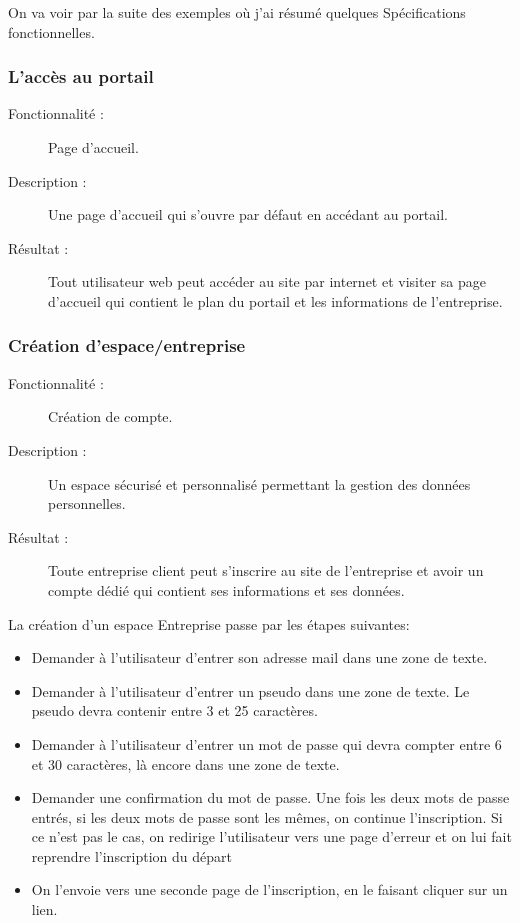 \documentclass[12pt]{article}
\begin{document}
On va voir par la suite  des exemples où j'ai résumé quelques Spécifications fonctionnelles.

\subsubsection{L'accès au portail}
 
\begin{description}

\item[Fonctionnalité :] Page d'accueil.

\item[Description :] Une page d’accueil qui s'ouvre par
défaut en accédant au portail.

\item[Résultat :]  Tout utilisateur web peut accéder au site  par internet et visiter sa  page d'accueil qui contient le plan du portail et les informations de l'entreprise.

\end{description}


\subsubsection{ Création d’espace/entreprise}


\begin{description}

\item[Fonctionnalité :] Création de compte.

\item[Description :]  Un espace sécurisé et personnalisé permettant la gestion des données personnelles.

\item[Résultat :]  Toute entreprise client peut s'inscrire
au site de l'entreprise et avoir un compte dédié qui contient ses informations et ses données.

\end{description}

La création d'un espace Entreprise passe par les étapes suivantes:
\begin{itemize}


\item Demander à l'utilisateur d'entrer son adresse mail dans une zone de texte.
\item Demander à l'utilisateur d'entrer un pseudo dans une zone de texte.
Le pseudo devra contenir entre 3 et 25 caractères.
\item
Demander à l'utilisateur d'entrer un mot de passe qui devra compter entre 6 et 30 caractères, là encore dans une zone de
texte.
\item
Demander une confirmation du mot de passe.
Une fois les deux mots de passe entrés, si les deux mots de passe sont les
mêmes, on continue l'inscription.
Si ce n'est pas le cas, on redirige l'utilisateur vers une page d'erreur et on lui fait reprendre l'inscription du départ
\item
On l'envoie vers une seconde page de l'inscription, en le faisant cliquer sur un lien.

\end{itemize}
\end{document}
